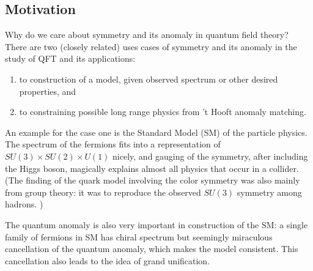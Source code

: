 \documentclass[
]{scrartcl}
\providecommand{\tightlist}{%
  \setlength{\itemsep}{0pt}\setlength{\parskip}{0pt}}
\numberwithin{equation}{section}
\theoremstyle{definition}
\theoremstyle{definition}
\theoremstyle{definition}
\theoremstyle{definition}
\theoremstyle{remark}
\begin{document}
\hypertarget{motivation}{%
\subsection{Motivation}\label{motivation}}

Why do we care about symmetry and its anomaly in quantum field theory?
There are two (closely related) uses cases of symmetry and its anomaly in the study of QFT and its applications:

\begin{enumerate}
\def\labelenumi{\arabic{enumi}.}
\tightlist
\item
  to construction of a model, given observed spectrum or other desired properties, and
\item
  to constraining possible long range physics from 't Hooft anomaly matching.
\end{enumerate}

An example for the case one is the Standard Model (SM) of the particle physics.
The spectrum of the fermions fits into a representation of \(SU(3)\times SU(2) \times U(1)\) nicely, and gauging of the symmetry, after including the Higgs boson, magically explains almost all physics that occur in a collider. (The finding of the quark model involving the color symmetry was also mainly from group theory: it was to reproduce the observed \(SU(3)\) symmetry among hadrons. )

The quantum anomaly is also very important in construction of the SM: a single family of fermions in SM has chiral spectrum but seemingly miraculous cancellation of the quantum anomaly, which makes the model consistent. This cancellation also leads to the idea of grand unification.
\end{document}
